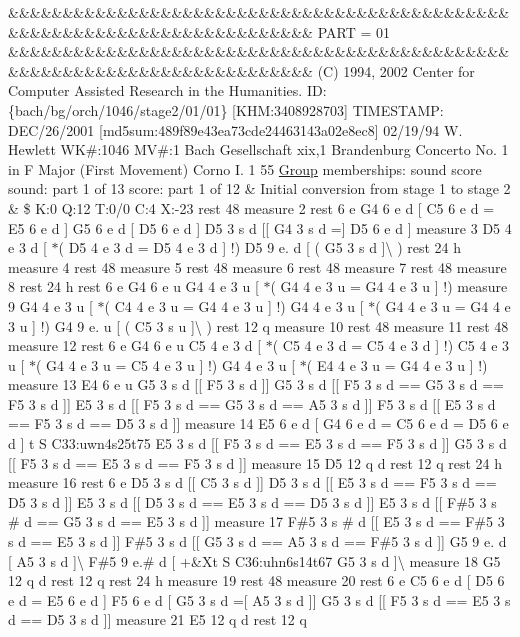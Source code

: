 \&\&\&\&\&\&\&\&\&\&\&\&\&\&\&\&\&\&\&\&\&\&\&\&\&\&\&\&\&\&\&\&\&\&\&\&\&\&\&\&\&\&\&\&\&\&\&\&\&\&\&\&\&\&\&\&\&\&\&\&\&\&\&\&\&\&\&\&\&\&\&\&\&\& P\+A\+RT = 01 \&\&\&\&\&\&\&\&\&\&\&\&\&\&\&\&\&\&\&\&\&\&\&\&\&\&\&\&\&\&\&\&\&\&\&\&\&\&\&\&\&\&\&\&\&\&\&\&\&\&\&\&\&\&\&\&\&\&\&\&\&\&\&\&\&\&\&\&\&\&\&\&\&\& (C) 1994, 2002 Center for Computer Assisted Research in the Humanities. ID\+: \{bach/bg/orch/1046/stage2/01/01\} \mbox{[}K\+HM\+:3408928703\mbox{]} T\+I\+M\+E\+S\+T\+A\+MP\+: D\+E\+C/26/2001 \mbox{[}md5sum\+:489f89e43ea73cde24463143a02e8ec8\mbox{]} 02/19/94 W. Hewlett WK\#\+:1046 MV\#\+:1 Bach Gesellschaft xix,1 Brandenburg Concerto No. 1 in F Major (First Movement) Corno I. 1 55 \hyperlink{class_group}{Group} memberships\+: sound score sound\+: part 1 of 13 score\+: part 1 of 12 \& Initial conversion from stage 1 to stage 2 \& \$ K\+:0 Q\+:12 T\+:0/0 C\+:4 X\+:-\/23 rest 48 measure 2 rest 6 e G4 6 e d \mbox{[} C5 6 e d = E5 6 e d \mbox{]} G5 6 e d \mbox{[} D5 6 e d \mbox{]} D5 3 s d \mbox{[}\mbox{[} G4 3 s d =\mbox{]} D5 6 e d \mbox{]} measure 3 D5 4 e 3 d \mbox{[} $\ast$( D5 4 e 3 d = D5 4 e 3 d \mbox{]} !) D5 9 e. d \mbox{[} ( G5 3 s d \mbox{]}\textbackslash{} ) rest 24 h measure 4 rest 48 measure 5 rest 48 measure 6 rest 48 measure 7 rest 48 measure 8 rest 24 h rest 6 e G4 6 e u G4 4 e 3 u \mbox{[} $\ast$( G4 4 e 3 u = G4 4 e 3 u \mbox{]} !) measure 9 G4 4 e 3 u \mbox{[} $\ast$( C4 4 e 3 u = G4 4 e 3 u \mbox{]} !) G4 4 e 3 u \mbox{[} $\ast$( G4 4 e 3 u = G4 4 e 3 u \mbox{]} !) G4 9 e. u \mbox{[} ( C5 3 s u \mbox{]}\textbackslash{} ) rest 12 q measure 10 rest 48 measure 11 rest 48 measure 12 rest 6 e G4 6 e u C5 4 e 3 d \mbox{[} $\ast$( C5 4 e 3 d = C5 4 e 3 d \mbox{]} !) C5 4 e 3 u \mbox{[} $\ast$( G4 4 e 3 u = C5 4 e 3 u \mbox{]} !) G4 4 e 3 u \mbox{[} $\ast$( E4 4 e 3 u = G4 4 e 3 u \mbox{]} !) measure 13 E4 6 e u G5 3 s d \mbox{[}\mbox{[} F5 3 s d \mbox{]}\mbox{]} G5 3 s d \mbox{[}\mbox{[} F5 3 s d == G5 3 s d == F5 3 s d \mbox{]}\mbox{]} E5 3 s d \mbox{[}\mbox{[} F5 3 s d == G5 3 s d == A5 3 s d \mbox{]}\mbox{]} F5 3 s d \mbox{[}\mbox{[} E5 3 s d == F5 3 s d == D5 3 s d \mbox{]}\mbox{]} measure 14 E5 6 e d \mbox{[} G4 6 e d = C5 6 e d = D5 6 e d \mbox{]} t S C33\+:uwn4s25t75 E5 3 s d \mbox{[}\mbox{[} F5 3 s d == E5 3 s d == F5 3 s d \mbox{]}\mbox{]} G5 3 s d \mbox{[}\mbox{[} F5 3 s d == E5 3 s d == F5 3 s d \mbox{]}\mbox{]} measure 15 D5 12 q d rest 12 q rest 24 h measure 16 rest 6 e D5 3 s d \mbox{[}\mbox{[} C5 3 s d \mbox{]}\mbox{]} D5 3 s d \mbox{[}\mbox{[} E5 3 s d == F5 3 s d == D5 3 s d \mbox{]}\mbox{]} E5 3 s d \mbox{[}\mbox{[} D5 3 s d == E5 3 s d == D5 3 s d \mbox{]}\mbox{]} E5 3 s d \mbox{[}\mbox{[} F\#5 3 s \# d == G5 3 s d == E5 3 s d \mbox{]}\mbox{]} measure 17 F\#5 3 s \# d \mbox{[}\mbox{[} E5 3 s d == F\#5 3 s d == E5 3 s d \mbox{]}\mbox{]} F\#5 3 s d \mbox{[}\mbox{[} G5 3 s d == A5 3 s d == F\#5 3 s d \mbox{]}\mbox{]} G5 9 e. d \mbox{[} A5 3 s d \mbox{]}\textbackslash{} F\#5 9 e.\# d \mbox{[} +\&Xt S C36\+:uhn6s14t67 G5 3 s d \mbox{]}\textbackslash{} measure 18 G5 12 q d rest 12 q rest 24 h measure 19 rest 48 measure 20 rest 6 e C5 6 e d \mbox{[} D5 6 e d = E5 6 e d \mbox{]} F5 6 e d \mbox{[} G5 3 s d =\mbox{[} A5 3 s d \mbox{]}\mbox{]} G5 3 s d \mbox{[}\mbox{[} F5 3 s d == E5 3 s d == D5 3 s d \mbox{]}\mbox{]} measure 21 E5 12 q d rest 12 q 